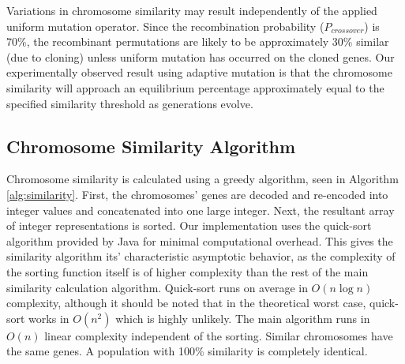 \documentclass[conference]{IEEEtran}
\begin{document}
Variations in chromosome similarity may result independently of the applied uniform mutation operator. Since the recombination probability ($P_{crossover}$) is 70\%, the recombinant permutations are likely to be approximately 30\% similar (due to cloning) unless uniform mutation has occurred on the cloned genes. Our experimentally observed result using adaptive mutation is that the chromosome similarity will approach an equilibrium percentage approximately equal to the specified similarity threshold as generations evolve.

\subsection{Chromosome Similarity Algorithm}
Chromosome similarity is calculated using a greedy algorithm, seen in Algorithm \ref{alg:similarity}. First, the chromosomes' genes are decoded and re-encoded into integer values and concatenated into one large integer. Next, the resultant array of integer representations is sorted. Our implementation uses the quick-sort algorithm provided by Java for minimal computational overhead. This gives the similarity algorithm its' characteristic asymptotic behavior, as the complexity of the sorting function itself is of higher complexity than the rest of the main similarity calculation algorithm. Quick-sort runs on average in $O(n \log n)$ complexity, although it should be noted that in the theoretical worst case, quick-sort works in $O(n^2)$ which is highly unlikely. The main algorithm runs in $O(n)$ linear complexity independent of the sorting. Similar chromosomes have the same genes. A population with 100\% similarity is completely identical.
\end{document}
